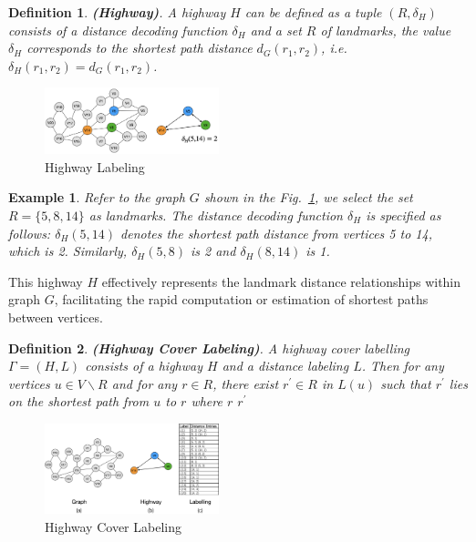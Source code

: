 \documentclass[sigconf]{acmart}
\newtheorem{definition}{Definition}
\newtheorem{example}{Example}
\begin{document}
\begin{definition}
    \textbf{(Highway)}. A highway $H$ can be defined as a tuple $\left(R, \delta_{H}\right)$ consists of a distance decoding function $\delta_{H}$ and a set $R$ of landmarks, the value $\delta_{H}$ corresponds to the shortest path distance $d_{G}\left(r_{1}, r_{2}\right)$, i.e.
  $\delta_{H}\left(r_{1}, r_{2}\right)=d_{G}\left(r_{1}, r_{2}\right)$.\par
\end{definition}
%
%
\begin{figure}
\centering
\includegraphics[width=0.45\textwidth]{figures/3-1-highway.png}
\caption{Highway Labeling} \label{fig2}
\end{figure}

\begin{example}
    Refer to the graph $G$ shown in the Fig.~\ref{fig2}, we select the set $R=\{5,8,14\}$ as landmarks. The distance decoding function $\delta_{H}$ is specified as follows: $\delta_{H}(5,14)$ denotes the shortest path distance from vertices 5 to 14, which is 2. Similarly, $\delta_{H}(5,8)$ is 2 and  $\delta_{H}(8,14)$ is 1.
\end{example}
%    
%
 This highway $H$ effectively represents the landmark distance relationships within graph $G$, facilitating the rapid computation or estimation of shortest paths between vertices.

\begin{definition}
    \textbf{(Highway Cover Labeling)}. A highway cover labelling $\Gamma=(H, L)$ consists of a highway $H$ and a distance labeling $L$. Then for any vertices $u \in V \backslash R$ and for any $r \in R$, there exist $r^{\prime} \in R$ in $L(u)$ such that $r^{\prime}$ lies on the shortest path from $u$ to $r$ \text {(} where $r$  $r^{\prime}$ 
\end{definition}

%
%
\begin{figure}
\includegraphics[width=0.45\textwidth]{figures/3-2-highway-cover.png}
\caption{Highway Cover Labeling} \label{fig3}
\end{figure}
%
\end{document}
